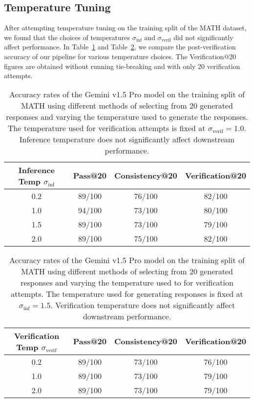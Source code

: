 \subsection{Temperature Tuning}
\label{app:temp}

After attempting temperature tuning on the training split of the MATH dataset, we found that the choices of temperatures $\sigma_{\mathrm{inf}}$ and $\sigma_{\mathrm{verif}}$ did not significantly affect performance.
In Table~\ref{tab:inference_temp_modified} and Table~\ref{tab:verification_temp_modified}, we compare the post-verification accuracy of our pipeline for various temperature choices.
The Verification@20 figures are obtained without running tie-breaking and with only 20 verification attempts.

\begin{table}[H]
\centering
\begin{tabular}{cccc}
\toprule
\textbf{Inference Temp \(\sigma_{\mathrm{inf}}\)} & \textbf{Pass@20} & \textbf{Consistency@20} & \textbf{Verification@20} \\
\midrule
0.2 & 89/100 & 76/100 & 82/100 \\
1.0 & 94/100 & 73/100 & 80/100 \\
1.5 & 89/100 & 73/100 & 79/100 \\
2.0 & 89/100 & 75/100 & 82/100 \\
\bottomrule
\end{tabular}
\caption{Accuracy rates of the Gemini v1.5 Pro model on the training split of MATH using different methods of selecting from 20 generated responses and varying the temperature used to generate the responses. The temperature used for verification attempts is fixed at \(\sigma_{\mathrm{verif}} = 1.0\). Inference temperature does not significantly affect downstream performance.}
\label{tab:inference_temp_modified}
\end{table}

\begin{table}[H]
\centering
\begin{tabular}{cccc}
\toprule
\textbf{Verification Temp \(\sigma_{\mathrm{verif}}\)} & \textbf{Pass@20} & \textbf{Consistency@20} & \textbf{Verification@20} \\
\midrule
0.2 & 89/100 & 73/100 & 76/100 \\
1.0 & 89/100 & 73/100 & 79/100 \\
2.0 & 89/100 & 73/100 & 79/100 \\
\bottomrule
\end{tabular}
\caption{Accuracy rates of the Gemini v1.5 Pro model on the training split of MATH using different methods of selecting from 20 generated responses and varying the temperature used to for verification attempts. The temperature used for generating responses is fixed at \(\sigma_{\mathrm{inf}} = 1.5\). Verification temperature does not significantly affect downstream performance.}
\label{tab:verification_temp_modified}
\end{table}


